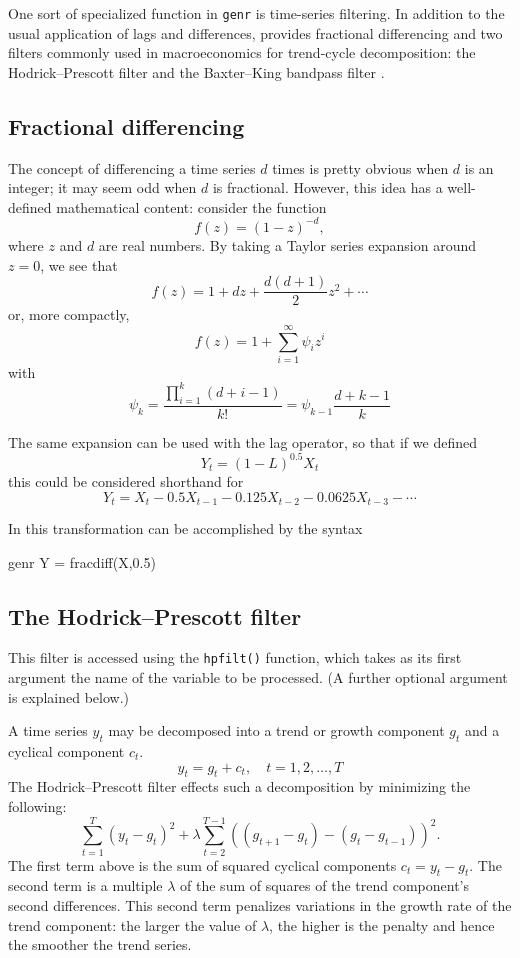 One sort of specialized function in \verb+genr+ is time-series
filtering. In addition to the usual application of lags and
differences,  provides fractional differencing and two
filters commonly used in macroeconomics for trend-cycle decomposition:
the Hodrick--Prescott filter \citep{hodrick97} and the Baxter--King
bandpass filter \citep{baxter-king99}.

\subsection{Fractional differencing}
\label{sec:fracdiff}

The concept of differencing a time series $d$ times is pretty obvious
when $d$ is an integer; it may seem odd when $d$ is
fractional. However, this idea has a well-defined
mathematical content: consider the function
\[
  f(z) = (1 - z)^{-d},
\]
where $z$ and $d$ are real numbers. By taking a Taylor series
expansion around $z=0$, we see that
\[
  f(z) = 1 + dz + \frac{d (d+1)}{2} z^2 + \cdots 
\]
or, more compactly,
\[
  f(z) = 1 + \sum_{i=1}^{\infty} \psi_i z^i
\]
with
\[
  \psi_k = \frac{\prod_{i=1}^{k} (d+i-1) }{k!} = \psi_{k-1} \frac{d+k-1}{k}
\]

The same expansion can be used with the lag operator, so that if we defined
\[
  Y_t = (1-L)^{0.5} X_t
\]
this could be considered shorthand for
\[
Y_t = X_t - 0.5 X_{t-1} - 0.125 X_{t-2} - 0.0625 X_{t-3} - \cdots 
\]
    
In  this transformation can be accomplished by the syntax 
\begin{code}
genr Y = fracdiff(X,0.5)
\end{code}

\subsection{The Hodrick--Prescott filter}
\label{sec:hodrick-prescott}

This filter is accessed using the \verb+hpfilt()+ function, which
takes as its first argument the name of the variable to be processed.
(A further optional argument is explained below.)

A time series $y_t$ may be decomposed into a trend or growth
component $g_t$ and a cyclical component $c_t$.  
%
\[
y_t = g_t + c_t, \quad t = 1,2,\dots,T
\]
%
The Hodrick--Prescott filter effects such a decomposition by
minimizing the following:
%
\[
    \sum_{t = 1}^T {(y_t - g_t )^2 } + \lambda \sum_{t = 2}^{T -
      1} \left((g_{t+1} - g_t) - (g_t - g_{t - 1} )\right)^2 .
\]
%
The first term above is the sum of squared cyclical components $c_t =
y_t - g_t$. The second term is a multiple $\lambda$ of the sum of
squares of the trend component's second differences. This
second term penalizes variations in the growth rate of the trend
component: the larger the value of $\lambda$, the higher is the
penalty and hence the smoother the trend series.

